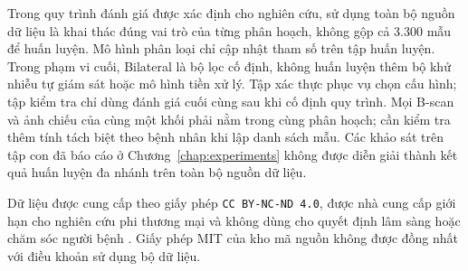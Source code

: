 \documentclass[14pt,a4paper,oneside]{extreport}
\begin{document}
Trong quy trình đánh giá được xác định cho nghiên cứu, sử dụng toàn bộ
nguồn dữ liệu là khai thác đúng vai trò của từng phân hoạch, không gộp
cả 3.300 mẫu để huấn luyện. Mô hình phân loại chỉ cập nhật tham số
trên tập huấn luyện. Trong phạm vi cuối, Bilateral là bộ lọc cố định,
không huấn luyện thêm bộ khử nhiễu tự giám sát hoặc mô hình tiền xử lý.
Tập xác thực phục vụ chọn cấu hình; tập kiểm tra chỉ dùng
đánh giá cuối cùng sau khi cố định quy trình. Mọi B-scan và ảnh chiếu
của cùng một khối phải nằm trong cùng phân hoạch; cần kiểm tra thêm
tính tách biệt theo bệnh nhân khi lập danh sách mẫu.
Các khảo sát trên tập con đã báo cáo ở Chương~\ref{chap:experiments} không được diễn giải
thành kết quả huấn luyện đa nhánh trên toàn bộ nguồn dữ liệu.

Dữ liệu được cung cấp theo giấy phép
\texttt{CC BY-NC-ND 4.0}, được nhà cung cấp giới hạn cho nghiên cứu
phi thương mại và không dùng cho quyết định lâm sàng hoặc chăm sóc
người bệnh \cite{harvardgfRepo}. Giấy phép MIT của kho mã nguồn
không được đồng nhất với điều khoản sử dụng bộ dữ liệu.

%
%
\end{document}
